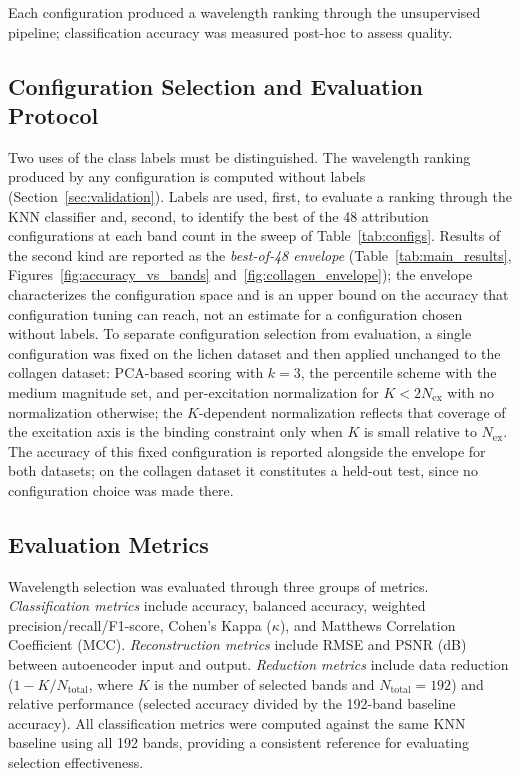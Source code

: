 Each configuration produced a wavelength ranking through the unsupervised pipeline; classification accuracy was measured post-hoc to assess quality.

\subsection{Configuration Selection and Evaluation Protocol}
\label{sec:protocol}
Two uses of the class labels must be distinguished.
The wavelength ranking produced by any configuration is computed without labels (Section~\ref{sec:validation}).
Labels are used, first, to evaluate a ranking through the KNN classifier and, second, to identify the best of the 48 attribution configurations at each band count in the sweep of Table~\ref{tab:configs}.
Results of the second kind are reported as the \emph{best-of-48 envelope} (Table~\ref{tab:main_results}, Figures~\ref{fig:accuracy_vs_bands} and~\ref{fig:collagen_envelope}); the envelope characterizes the configuration space and is an upper bound on the accuracy that configuration tuning can reach, not an estimate for a configuration chosen without labels.
To separate configuration selection from evaluation, a single configuration was fixed on the lichen dataset and then applied unchanged to the collagen dataset: PCA-based scoring with $k = 3$, the percentile scheme with the medium magnitude set, and per-excitation normalization for $K < 2N_{\text{ex}}$ with no normalization otherwise; the $K$-dependent normalization reflects that coverage of the excitation axis is the binding constraint only when $K$ is small relative to $N_{\text{ex}}$.
The accuracy of this fixed configuration is reported alongside the envelope for both datasets; on the collagen dataset it constitutes a held-out test, since no configuration choice was made there.

\subsection{Evaluation Metrics}
\label{sec:metrics}

Wavelength selection was evaluated through three groups of metrics.
\emph{Classification metrics} include accuracy, balanced accuracy, weighted precision/recall/F1-score, Cohen's Kappa ($\kappa$), and Matthews Correlation Coefficient (MCC).
\emph{Reconstruction metrics} include RMSE and PSNR (dB) between autoencoder input and output.
\emph{Reduction metrics} include data reduction ($1 - K/N_{\text{total}}$, where $K$ is the number of selected bands and $N_{\text{total}} = 192$) and relative performance (selected accuracy divided by the 192-band baseline accuracy).
All classification metrics were computed against the same KNN baseline using all 192 bands, providing a consistent reference for evaluating selection effectiveness.